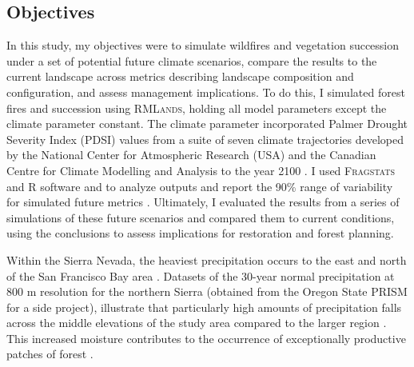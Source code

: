 \subsection*{Objectives}
In this study, my objectives were to simulate wildfires and vegetation succession under a set of potential future climate scenarios, compare the results to the current landscape across metrics describing landscape composition and configuration, and assess management implications. To do this, I simulated forest fires and succession using \textsc{RMLands}, holding all model parameters except the climate parameter constant. The climate parameter incorporated Palmer Drought Severity Index (PDSI) values from a suite of seven climate trajectories developed by the National Center for Atmospheric Research (USA) and the Canadian Centre for Climate Modelling and Analysis to the year 2100 \citep{Cook2014}. I used \textsc{Fragstats} and R software and to analyze outputs and report the 90\% range of variability for simulated future metrics \citep{Fragstats2012,RCoreTeam2013}. Ultimately, I evaluated the results from a series of simulations of these future scenarios and compared them to current conditions, using the conclusions to assess implications for restoration and forest planning.




Within the Sierra Nevada, the heaviest precipitation occurs to the east and north of the San Francisco Bay area \citep{VanWag2006}. Datasets of the 30-year normal precipitation at 800 m resolution for the northern Sierra (obtained from the Oregon State PRISM for a side project), illustrate that particularly high amounts of precipitation falls across the middle elevations of the study area compared to the larger region \citep{PRISMClimateGroup2004}. This increased moisture contributes to the occurrence of exceptionally productive patches of forest \citep[][ Alan Doerr, personal communication]{Littell2012}.





